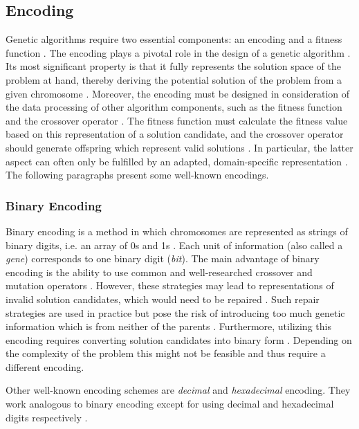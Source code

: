 \documentclass[sigconf]{acmart}
\begin{document}
\subsection{Encoding}
Genetic algorithms require two essential components: an encoding and
a fitness function \cite{Affenzeller2009}.
The encoding plays a pivotal role in the design of a genetic algorithm
\cite{Katoch2021}.
Its most significant property is that it fully represents the solution
space of the problem at hand, thereby deriving the potential solution of the
problem from a given chromosome \cite{Affenzeller2009}.
Moreover, the encoding must be designed in consideration of the data
processing of other algorithm components, such as the fitness function
and the crossover operator \cite{Affenzeller2009}.
The fitness function must calculate the fitness value based on this
representation of a solution candidate, and the crossover operator should
generate offspring which represent valid solutions \cite{Affenzeller2009}.
In particular, the latter aspect can often only be fulfilled by an adapted,
domain-specific representation \cite{Affenzeller2009}.
%
The following paragraphs present some well-known encodings.

\subsubsection{Binary Encoding}
Binary encoding is a method in which chromosomes are represented as strings
of binary digits, i.e. an array of 0s and 1s \cite{Katoch2021}.
Each unit of information (also called a \textit{gene}) corresponds to one binary
digit (\textit{bit}).
%
The main advantage of binary encoding is the ability to use common and
well-researched crossover and mutation operators \cite{Katoch2021}.
However, these strategies may lead to representations of invalid solution
candidates, which would need to be repaired \cite{Beligiannis2009}.
Such repair strategies are used in practice but pose the risk of introducing
too much genetic information which is from neither of the parents
\cite{Affenzeller2009,Beligiannis2009}.
%
Furthermore, utilizing this encoding requires converting solution candidates
into binary form \cite{Katoch2021}. Depending on the complexity of the problem
this might not be feasible and thus require a different encoding.

Other well-known encoding schemes are \textit{decimal} and \textit{hexadecimal}
encoding. They work analogous to binary encoding except for using decimal and
hexadecimal digits respectively \cite{Katoch2021}.
\end{document}
